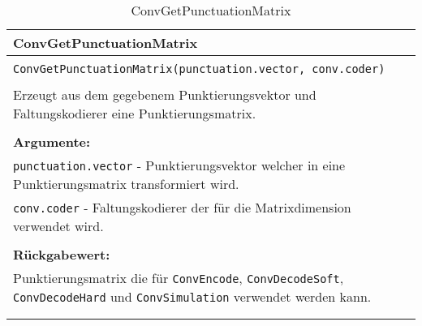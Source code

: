 \begin{longtable}{|p{\textwidth}|}
\hline
\rowcolor{lightblue}
ConvGetPunctuationMatrix
\\
\hline
\\
\texttt{ConvGetPunctuationMatrix(punctuation.vector, conv.coder)}\\
\\
Erzeugt aus dem gegebenem Punktierungsvektor und Faltungskodierer eine Punktierungsmatrix.\\
\\
\textbf{Argumente:}\\
\texttt{punctuation.vector} - Punktierungsvektor welcher in eine Punktierungsmatrix transformiert wird.\\
\texttt{conv.coder} - Faltungskodierer der für die Matrixdimension verwendet wird.\\
\\
\textbf{Rückgabewert:}\\
Punktierungsmatrix die für \texttt{ConvEncode}, \texttt{ConvDecodeSoft}, \texttt{ConvDecodeHard} und \texttt{ConvSimulation} verwendet werden kann.\\
\\
\hline
\caption{ConvGetPunctuationMatrix}
\label{funktion:ConvGetPunctuationMatrix}
\end{longtable}